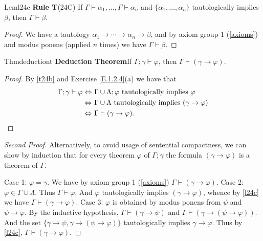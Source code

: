 \begin{reference}{Lem}{l24c}
  \textbf{Rule T}\quad (24C) If $\Gamma\vdash \alpha_1,\dots,\Gamma\vdash \alpha_n$ and $\{\alpha_1,\dots,\alpha_n\}$ tautologically implies $\beta$, then $\Gamma\vdash \beta$.
\end{reference}

\begin{proof}
  We have a tautology $\alpha_1\rightarrow\cdots\rightarrow \alpha_n\rightarrow \beta$, and by axiom group 1 (\ref{axioms}) and modus ponens (applied $n$ times) we have $\Gamma\vdash \beta$.
\end{proof}

\begin{reference}{Thm}{deductiont}
  \textbf{Deduction Theorem}\quad If $\Gamma;\gamma\vdash \varphi$, then $\Gamma\vdash(\gamma\rightarrow \varphi).$
\end{reference}

\begin{proof}
  By \ref{t24b} and Exercise \ref{E.1.2.4}(a) we have that
  \begin{align*}
    \Gamma;\gamma\vdash \varphi\Leftrightarrow\  & \Gamma\cup \Lambda;\varphi\text{ tautologically implies }\varphi \\\Leftrightarrow\ &\Gamma\cup \Lambda\text{ tautologically implies }(\gamma\rightarrow \varphi)\\\Leftrightarrow\ &\Gamma\vdash(\gamma\rightarrow \varphi).\qedhere
  \end{align*}
\end{proof}

\begin{proof}[Second Proof]
  Alternatively, to avoid usage of sentential compactness, we can show by induction that for every theorem $\varphi$ of $\Gamma;\gamma$ the formula $(\gamma\rightarrow \varphi)$ is a theorem of $\Gamma$.

  Case 1: $\varphi=\gamma$. We have by axiom group 1 (\ref{axioms}) $\Gamma\vdash(\gamma\rightarrow \varphi)$.\newline
  Case 2: $\varphi\in \Gamma\cup \Lambda$. Thus $\Gamma\vdash \varphi$. And $\varphi$ tautologically implies $(\gamma\rightarrow \varphi)$, whence by \ref{l24c} we have $\Gamma\vdash(\gamma\rightarrow \varphi)$.\newline
  Case 3: $\varphi$ is obtained by modus ponens from $\psi$ and $\psi\rightarrow \varphi$. By the inductive hypothesis, $\Gamma\vdash(\gamma\rightarrow \psi)$ and $\Gamma\vdash(\gamma\rightarrow(\psi\rightarrow \varphi))$. And the set $\{\gamma\rightarrow \psi, \gamma\rightarrow(\psi\rightarrow \varphi)\}$ tautologically implies $\gamma\rightarrow \varphi$. Thus by \ref{l24c}, $\Gamma\vdash(\gamma\rightarrow \varphi)$.
\end{proof}

